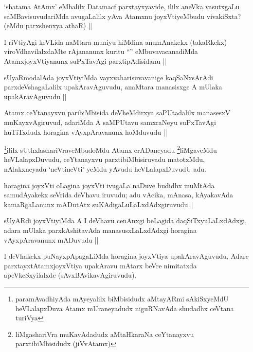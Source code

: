 \begin{artha}
`shatama AtAmx' eMbalilx Datamacf parxtayxyavide, ililx aneVka vasutxgaLu saMBavisuvudariMda avugaLalilx yAva Atamxnu joyxVtiyeMbudu vivakiSxta? (eMdu parxshenxya athaR) ||
\end{artha}

\begin{artha}
I riVtiyAgi keVLida naMtara muniyu hiMdina anumAnakekx (takaRkekx) viroVdhavilalxdaMte rAjananunx kuritu ``\stext'' eMbuvavacanadiMda AtamxjoyxVtiyanunx suPxTavAgi parxtipAdisidanu ||
\end{artha}

\begin{artha}
sUyaRmodalAda joyxVtiyiMda vayxvaharisuvavanige kaqSaNxsArAdi parxdeVshagaLalilx upakAravAguvudu, anaMtara manasisxge A mUlaka upakAravAguvudu ||
\end{artha}

\begin{artha}
Atamx ceYtanayxvu paribiMbisida deVheMdirxya saPUtadalilx manasesxV muKayxvAgiruvud, adariMda A saMPUtavu samxraNeyu suPxTavAgi huTiTxdudx horagina vAyxpAravanunx hoMduvudu ||
\end{artha}

\begin{artha}
\footnote{paramAvadhiyAda mAyeyalilx biMbisidudx aMtayARmi sAkiSxyeMdU heVLalapxDuva Atamx mUraneyadudx niguRNavAda shudadhx  ceVtana turiVya}ililx sUthxlashariVraveMbudoMdu Atamx erADaneyadu \footnote{liMgashariVra muKavAdadudx aMtaHkaraNa ceYtanayxvu parxtibiMbisidudx (jiVvAtamx)}liMgaveMdu heVLalapxDuvudu, ceYtanayxvu parxtibiMbisiruvadu matotxMdu, nAlakxneyadu `neVtineVti' yeMdu yAvudu heVLalapxDuvudU adu.
\end{artha}

\begin{artha}
horagina joyxVti oLagina joyxVti ivugaLa naDuve budidhx muMtAda samudAyakekx seVrida deVhavu iruvudu; adu vAcika, mAnasa, kAyakavAda kamaRgaLanunx mADutAtx suKAdigaLuLaLxdAdxgiruvudu ||
\end{artha}

\begin{artha}
sUyARdi joyxVtiyiMda A I deVhavu cenAnxgi beLagida daqSiTxyuLaLxdAdxgi, adara mUlaka parxkAshitavAda manasusxLaLxdAdxgi horagina vAyxpAravanunx mADuvudu ||
\end{artha}

\begin{artha}
I deVhakekx puNayxpApagaLiMda horagina joyxVtiya upakAravAguvudu, Adare parxtayxtAtamxjoyxVtiya upakAravu mAtarx beVre nimitatxda apeVkeSxyilalxde (sAvxBAvikavAgiruvudu).
\end{artha}

